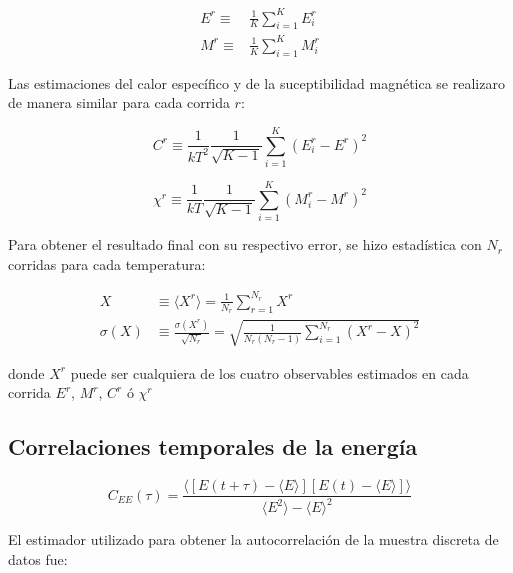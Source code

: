 \documentclass[a4paper,12pt]{article}
\begin{document}
\begin{subequations}
   \begin{align}
  E^r \equiv &\frac{1}{K}\sum_{i=1}^K E^r_i 
  \label{eq:E_prom}\\
  M^r \equiv & \frac{1}{K}\sum_{i=1}^K M^r_i 
  \label{eq:M_prom}
   \end{align}
\end{subequations}

Las estimaciones del calor específico y de la suceptibilidad magnética se 
realizaro de manera similar para cada corrida $r$:

\begin{equation}
 C^r \equiv  \frac{1}{kT^2} \frac{1}{\sqrt{K-1}} \sum_{i=1}^K \left(
 E_i^r - E^r \right)^2
\end{equation}

\begin{equation}
 \chi^r \equiv  \frac{1}{kT} \frac{1}{\sqrt{K-1}} \sum_{i=1}^K \left(
 M_i^r -  M^r \right)^2
\end{equation}

Para obtener el resultado final con su respectivo error, se hizo estadística 
con $N_r$ corridas para cada temperatura:

\begin{subequations}
\begin{align}
X & \equiv \langle X^r \rangle = \frac{1}{N_r} 
\sum_{r=1}^{N_r} X^r \\
\sigma(X) & \equiv \frac{\sigma(X^r)}{\sqrt{N_r}} =  \sqrt{\frac{1}{N_r(N_r-1)} 
\sum_{i=1}^{N_r} \left( 
 X^r -  X \right)^2}
\end{align}
\end{subequations}

\noindent donde $X^r$ puede ser cualquiera de los cuatro observables estimados 
en cada corrida $E^r$, $M^r$, $C^r$ ó $\chi^r$

\subsection{Correlaciones temporales de la energía}

\begin{equation}\label{eq:corr_teo}
C_{EE}(\tau) = \frac{\langle \left[E(t+\tau)-\langle 
E\rangle\right]\left[E(t)-\langle E \rangle\right] \rangle
}{\langle E^2\rangle - \langle E \rangle ^2}
\end{equation}

El estimador utilizado para obtener la autocorrelación de la muestra discreta 
de datos fue:
\end{document}
